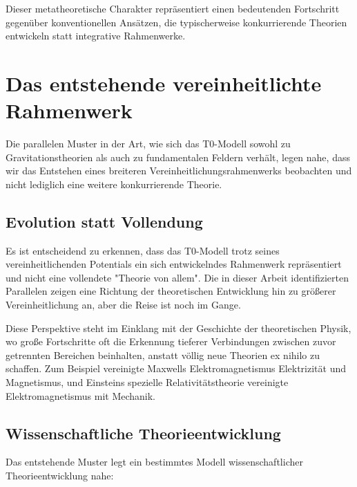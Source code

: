 \documentclass[12pt,a4paper]{article}
\begin{document}
	Dieser metatheoretische Charakter repräsentiert einen bedeutenden Fortschritt gegenüber konventionellen Ansätzen, die typischerweise konkurrierende Theorien entwickeln statt integrative Rahmenwerke.
	
	\section{Das entstehende vereinheitlichte Rahmenwerk}
	\label{sec:emerging_framework}
	
	Die parallelen Muster in der Art, wie sich das T0-Modell sowohl zu Gravitationstheorien als auch zu fundamentalen Feldern verhält, legen nahe, dass wir das Entstehen eines breiteren Vereinheitlichungsrahmenwerks beobachten und nicht lediglich eine weitere konkurrierende Theorie.
	
	\subsection{Evolution statt Vollendung}
	\label{subsec:evolution}
	
	Es ist entscheidend zu erkennen, dass das T0-Modell trotz seines vereinheitlichenden Potentials ein sich entwickelndes Rahmenwerk repräsentiert und nicht eine vollendete "Theorie von allem". Die in dieser Arbeit identifizierten Parallelen zeigen eine Richtung der theoretischen Entwicklung hin zu größerer Vereinheitlichung an, aber die Reise ist noch im Gange.
	
	Diese Perspektive steht im Einklang mit der Geschichte der theoretischen Physik, wo große Fortschritte oft die Erkennung tieferer Verbindungen zwischen zuvor getrennten Bereichen beinhalten, anstatt völlig neue Theorien ex nihilo zu schaffen. Zum Beispiel vereinigte Maxwells Elektromagnetismus Elektrizität und Magnetismus, und Einsteins spezielle Relativitätstheorie vereinigte Elektromagnetismus mit Mechanik.
	
	\subsection{Wissenschaftliche Theorieentwicklung}
	\label{subsec:theory_development}
	
	Das entstehende Muster legt ein bestimmtes Modell wissenschaftlicher Theorieentwicklung nahe:
	
\end{document}
